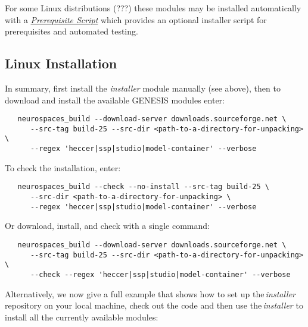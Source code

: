 \documentclass[12pt]{article}
\begin{document}
For some Linux distributions (???) these modules may be installed automatically with a \href{../prerequisite-script/prerequisite-script.tex}{\it Prerequisite Script} which provides an optional installer script for prerequisites and automated testing.

\subsection*{Linux Installation}

In summary, first install the {\it installer} module manually (see above), then to download and install the available GENESIS modules enter:
\begin{verbatim}
   neurospaces_build --download-server downloads.sourceforge.net \
      --src-tag build-25 --src-dir <path-to-a-directory-for-unpacking> \
      --regex 'heccer|ssp|studio|model-container' --verbose
\end{verbatim}
To check the installation, enter:
\begin{verbatim}
   neurospaces_build --check --no-install --src-tag build-25 \
      --src-dir <path-to-a-directory-for-unpacking> \
      --regex 'heccer|ssp|studio|model-container' --verbose
\end{verbatim}
Or download, install, and check with a single command:
\begin{verbatim}
   neurospaces_build --download-server downloads.sourceforge.net \
      --src-tag build-25 --src-dir <path-to-a-directory-for-unpacking> \
      --check --regex 'heccer|ssp|studio|model-container' --verbose
\end{verbatim}

Alternatively, we now give a full example that shows how to set up the\,{\it installer} repository on your local machine, check out the code and then use the\,{\it installer} to install all the currently available modules:
\end{document}
